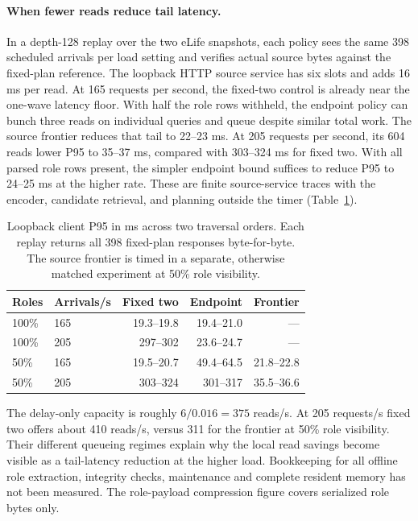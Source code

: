 \documentclass[sigconf,natbib=true,anonymous=true,pbalance=true]{acmart}
\begin{document}
\paragraph{When fewer reads reduce tail latency.}
In a depth-128 replay over the two eLife snapshots, each policy sees the same 398 scheduled arrivals per load setting and verifies actual source bytes against the fixed-plan reference. The loopback HTTP source service has six slots and adds 16 ms per read. At 165 requests per second, the fixed-two control is already near the one-wave latency floor. With half the role rows withheld, the endpoint policy can bunch three reads on individual queries and queue despite similar total work. The source frontier reduces that tail to 22--23 ms. At 205 requests per second, its 604 reads lower P95 to 35--37 ms, compared with 303--324 ms for fixed two. With all parsed role rows present, the simpler endpoint bound suffices to reduce P95 to 24--25 ms at the higher rate. These are finite source-service traces with the encoder, candidate retrieval, and planning outside the timer (Table~\ref{tab:source-capacity}).

\begin{table}[t]
\caption{Loopback client P95 in ms across two traversal orders. Each replay returns all 398 fixed-plan responses byte-for-byte. The source frontier is timed in a separate, otherwise matched experiment at 50\% role visibility.}
\label{tab:source-capacity}
\centering\small
\begin{tabular}{@{}llrrr@{}}
\toprule
Roles & Arrivals/s & Fixed two & Endpoint & Frontier \\
\midrule
100\% & 165 & 19.3--19.8 & 19.4--21.0 & --- \\
100\% & 205 & 297--302 & 23.6--24.7 & --- \\
50\% & 165 & 19.5--20.7 & 49.4--64.5 & 21.8--22.8 \\
50\% & 205 & 303--324 & 301--317 & 35.5--36.6 \\
\bottomrule
\end{tabular}
\end{table}

The delay-only capacity is roughly $6/0.016=375$ reads/s. At 205 requests/s fixed two offers about 410 reads/s, versus 311 for the frontier at 50\% role visibility. Their different queueing regimes explain why the local read savings become visible as a tail-latency reduction at the higher load. Bookkeeping for all offline role extraction, integrity checks, maintenance and complete resident memory has not been measured. The role-payload compression figure covers serialized role bytes only.
\end{document}

